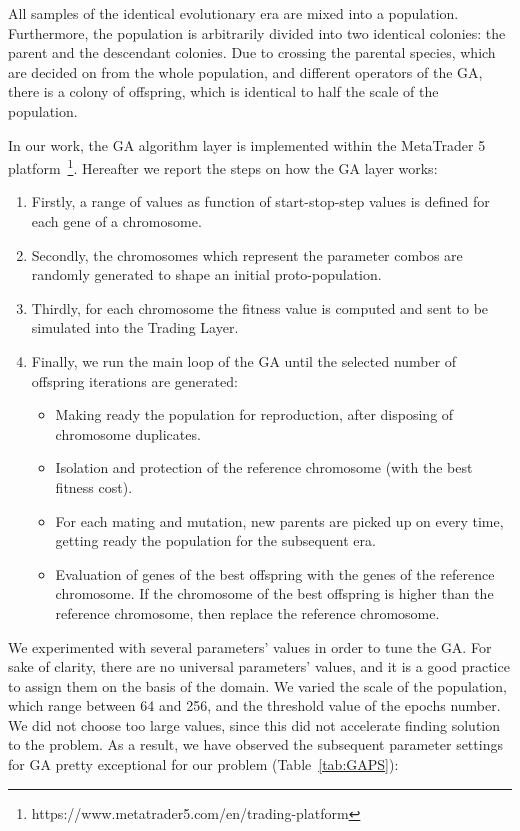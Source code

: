 All samples of the identical evolutionary era are mixed into a population. Furthermore, the population is arbitrarily divided into two identical colonies: the parent and the descendant colonies. Due to crossing the parental species, which are decided on from the whole population, and different operators of the GA, there is a colony of offspring, which is identical to half the scale of the population.

In our work, the GA algorithm layer is implemented within the MetaTrader 5 platform~\footnote{https://www.metatrader5.com/en/trading-platform}.
Hereafter we report the steps on how the GA layer works:

\begin{enumerate}
\setlength\itemsep{0.3em}
\item Firstly, a range of values as function of start-stop-step values is defined for each gene of a chromosome.
\item Secondly, the chromosomes which represent the parameter combos are randomly generated to shape an initial proto-population.
\item Thirdly, for each chromosome the fitness value is computed and sent to be simulated into the Trading Layer.
\item Finally, we run the main loop of the GA until the selected number of offspring iterations are generated:
\begin{itemize}	
	\item Making ready the population for reproduction, after disposing of chromosome duplicates.
	\item Isolation and protection of the reference chromosome (with the best fitness cost).
	\item For each mating and mutation, new parents are picked up on every time, getting ready the population for the subsequent era.
	\item Evaluation of genes of the best offspring with the genes of the reference chromosome. If the chromosome of the best offspring is higher than the reference chromosome, then replace the reference chromosome.
\end{itemize}
\end{enumerate}

We experimented with several parameters' values in order to tune the GA. For sake of clarity, there are no universal parameters' values, and it is a good practice to assign them on the basis of the domain. We varied the scale of the population, which range between 64 and 256, and the threshold value of the epochs number. We did not choose too large values, since this did not accelerate finding solution to the problem. 
As a result, we have observed the subsequent parameter settings for GA pretty exceptional for our problem (Table~\ref{tab:GAPS}):

